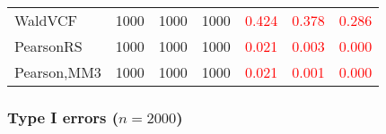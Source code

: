 \documentclass[
]{article}
\begin{document}
\begin{table}[H]
{\begin{tabular}[t]{lrrrrrr}
\hspace{1em}WaldVCF & 1000 & 1000 & 1000 & \textcolor{red}{0.424} & \textcolor{red}{0.378} & \textcolor{red}{0.286}\\
\hspace{1em}PearsonRS & 1000 & 1000 & 1000 & \textcolor{red}{0.021} & \textcolor{red}{0.003} & \textcolor{red}{0.000}\\
\hspace{1em}Pearson,MM3 & 1000 & 1000 & 1000 & \textcolor{red}{0.021} & \textcolor{red}{0.001} & \textcolor{red}{0.000}\\
\bottomrule
\end{tabular}}
\endgroup{}
\end{table}

\hypertarget{type-i-errors-n2000-2}{%
\subsubsection{\texorpdfstring{Type I errors
(\(n=2000\))}{Type I errors (n=2000)}}\label{type-i-errors-n2000-2}}
\end{document}
